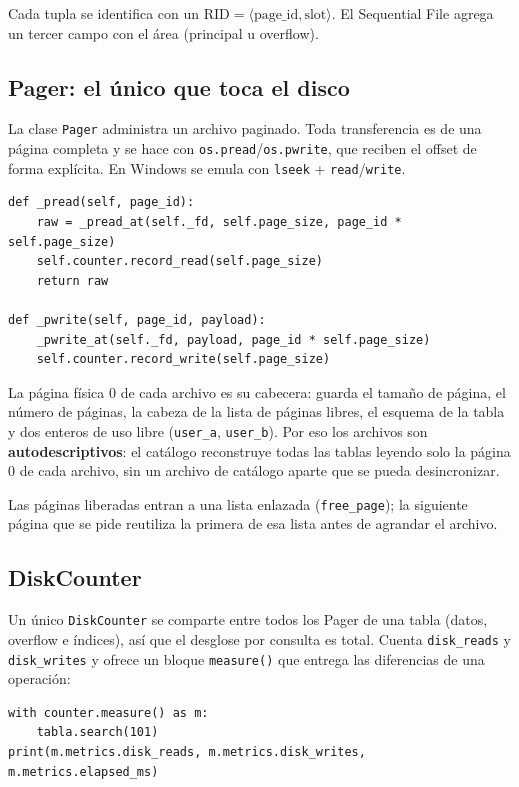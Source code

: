 \documentclass[11pt,a4paper]{article}
\newcommand{\code}[1]{\texttt{#1}}
\begin{document}
Cada tupla se identifica con un $\text{RID} = \langle \text{page\_id}, \text{slot}\rangle$.
El Sequential File agrega un tercer campo con el área (principal u overflow).

\subsection{Pager: el único que toca el disco}

La clase \code{Pager} administra un archivo paginado. Toda transferencia es de una
página completa y se hace con \code{os.pread}/\code{os.pwrite}, que reciben el
offset de forma explícita. En Windows se emula con \code{lseek} + \code{read}/\code{write}.

\begin{lstlisting}
def _pread(self, page_id):
    raw = _pread_at(self._fd, self.page_size, page_id * self.page_size)
    self.counter.record_read(self.page_size)
    return raw

def _pwrite(self, page_id, payload):
    _pwrite_at(self._fd, payload, page_id * self.page_size)
    self.counter.record_write(self.page_size)
\end{lstlisting}

La página física 0 de cada archivo es su cabecera: guarda el tamaño de página, el
número de páginas, la cabeza de la lista de páginas libres, el esquema de la tabla y
dos enteros de uso libre (\code{user\_a}, \code{user\_b}). Por eso los archivos son
\textbf{autodescriptivos}: el catálogo reconstruye todas las tablas leyendo solo la
página 0 de cada archivo, sin un archivo de catálogo aparte que se pueda
desincronizar.

Las páginas liberadas entran a una lista enlazada (\code{free\_page}); la siguiente
página que se pide reutiliza la primera de esa lista antes de agrandar el archivo.

\subsection{DiskCounter}

Un único \code{DiskCounter} se comparte entre todos los Pager de una tabla (datos,
overflow e índices), así que el desglose por consulta es total. Cuenta
\code{disk\_reads} y \code{disk\_writes} y ofrece un bloque \code{measure()} que
entrega las diferencias de una operación:

\begin{lstlisting}
with counter.measure() as m:
    tabla.search(101)
print(m.metrics.disk_reads, m.metrics.disk_writes, m.metrics.elapsed_ms)
\end{lstlisting}
\end{document}
